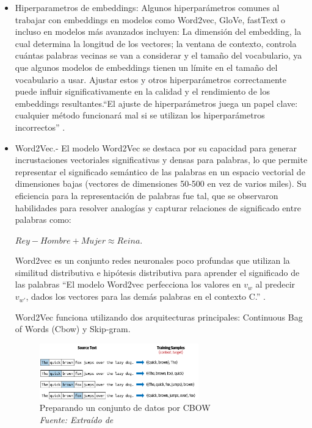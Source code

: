 \begin{itemize}
\begin{itemize}
	\item Hiperparametros de embeddings: Algunos hiperparámetros comunes al trabajar con embeddings en modelos como Word2vec, GloVe, fastText o incluso en modelos más avanzados incluyen:  La dimensión del embedding, la cual  determina la longitud de los vectores; la ventana de contexto, controla cuántas palabras vecinas se van a considerar y el tamaño del vocabulario, ya que algunos modelos de embeddings tienen un límite en el tamaño del vocabulario a usar. Ajustar estos y otros  hiperparámetros correctamente puede influir significativamente en la calidad y el rendimiento de los embeddings resultantes.``El ajuste de hiperparámetros juega un papel clave: cualquier método funcionará mal si se utilizan los hiperparámetros incorrectos'' \cite[p. 339]{eisenstein2018natural}.
	
	\item Word2Vec.- El modelo Word2Vec se destaca por su capacidad para generar incrustaciones vectoriales significativas y densas para palabras, lo que permite representar el significado semántico de las palabras en un espacio vectorial de dimensiones bajas (vectores de dimensiones 50-500 en vez de varios miles). Su eficiencia para la representación de palabras fue tal, que se observaron habilidades para resolver analogías y capturar relaciones de significado entre palabras como:  
	\begin{Center}
			$Rey - Hombre + Mujer \approx  Reina$.
	\end{Center}

	
Word2vec es un conjunto redes neuronales poco profundas que utilizan la similitud distributiva e hipótesis distributiva para aprender  el significado de las palabras ``El modelo Word2vec perfecciona los valores en $v_w$ al predecir $v_{w'}$, dados los vectores para las demás palabras en el contexto C.'' \cite[p. 95]{vajjala2020practical} .

Word2Vec funciona utilizando dos arquitecturas principales: Continuous Bag of Words (Cbow) y Skip-gram.

\begin{figure}[h!]
	\includegraphics[width=0.65\textwidth]{capitulo3/figuras/nlp3.png}
	\caption[Preparando un conjunto de datos por CBOW]{Preparando un conjunto de datos por CBOW
		\\\textit{Fuente: Extraído de} \protect\cite[p. 99]{vajjala2020practical}}
	\label{fig:nlp3}
\end{figure}


\end{itemize}
\end{itemize}
